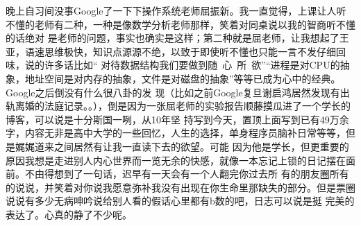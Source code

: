 晚上自习间没事Google了一下下操作系统老师屈振新。我一直觉得，上课让人听不懂的老师有二种，一种是像数学分析老师那样，笑着对同桌说以我的智商听不懂的话绝对
是老师的问题，事实也确实是这样；第二种就是屈老师，让我想起了王亚，语速思维极快，知识点源源不绝，以致于即使听不懂也只能一言不发仔细回味，说的许多话比如“
对待数据结构我们要做到随~心~所~欲”“进程是对CPU的抽象，地址空间是对内存的抽象，文件是对磁盘的抽象”等等已成为心中的经典。Google之后倒没有什么很八卦的发
现（比如之前Google复旦谢启鸿居然发现有出轨离婚的法庭记录。。），倒是因为一张屈老师的实验报告顺藤摸瓜进了一个学长的博客，可以说是十分斯国一咧，从10年坚
持写到今天，置顶上面写到已有49万余字，内容无非是高中大学的一些回忆，人生的选择，单身程序员脑补日常等等，但是娓娓道来之间居然有让我一直读下去的欲望。可能
因为他是学长，但更重要的原因我想是走进别人内心世界而一览无余的快感，就像一本忘记上锁的日记摆在面前。不由得想到了一句话，迟早有一天会有一个人翻完你过去所
有的朋友圈所有的说说，并笑着对你说我愿意弥补我没有出现在你生命里那缺失的部分。但是票圈说说有多少无病呻吟说给别人看的假话心里都有b数的吧，日志可以说是挺
完美的表达了。心真的静了不少呢。
